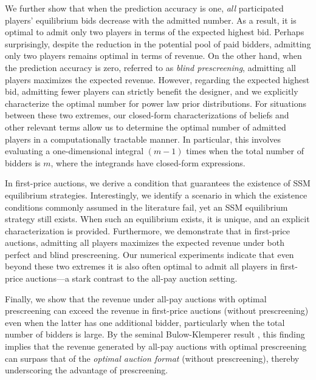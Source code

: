 We further show that when the prediction accuracy is one, \textit{all} participated players' equilibrium bids decrease with the admitted number.
As a result, it is optimal to admit only two players in terms of the expected highest bid. Perhaps surprisingly, despite the reduction in the potential pool of paid bidders, admitting only two players remains optimal in terms of revenue. On the other hand, when the prediction accuracy is zero, referred to as \emph{blind prescreening}, admitting all players maximizes the expected revenue. However, regarding the expected highest bid, admitting fewer players can strictly benefit the designer, and we explicitly characterize the optimal number for power law prior distributions. For situations between these two extremes, our closed-form characterizations of beliefs and other relevant terms allow us to determine the optimal number of admitted players in a computationally tractable manner. In particular, this involves evaluating a one-dimensional integral $(m-1)$ times when the total number of bidders
is $m$, where the integrands have closed-form expressions.

In first-price auctions, we derive a condition that guarantees the existence of SSM equilibrium strategies. Interestingly, we identify a scenario in which the existence conditions commonly assumed in the literature fail, yet an SSM equilibrium strategy still exists. When such an equilibrium exists, it is unique, and an explicit characterization is provided. Furthermore, we demonstrate that in first-price auctions, admitting all players maximizes the expected revenue under both perfect and blind prescreening. Our numerical experiments indicate that even beyond these two extremes it is also often optimal to admit all players in first-price auctions---a stark contrast to the all-pay auction setting.

Finally, we show that the revenue under all-pay auctions with optimal prescreening can exceed the revenue in first-price auctions (without prescreening) even when the latter has one additional bidder, particularly when the total number of bidders is large. By the seminal Bulow-Klemperer result \citep{bulow_1994_auctions_negotiations}, this finding implies that the revenue generated by all-pay auctions with optimal prescreening can surpass that of the \textit{optimal auction format} (without prescreening), thereby underscoring the advantage of prescreening.




